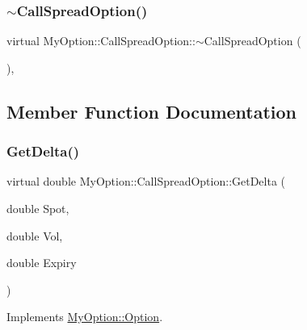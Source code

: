 \hypertarget{classMyOption_1_1CallSpreadOption_a20c0f91c648645718aa27007399101e7}{}\label{classMyOption_1_1CallSpreadOption_a20c0f91c648645718aa27007399101e7} 
\subsubsection{\texorpdfstring{$\sim$\+Call\+Spread\+Option()}{~CallSpreadOption()}}
{\footnotesize\ttfamily virtual My\+Option\+::\+Call\+Spread\+Option\+::$\sim$\+Call\+Spread\+Option (\begin{DoxyParamCaption}{ }\end{DoxyParamCaption})\hspace{0.3cm}{\ttfamily [inline]}, {\ttfamily [virtual]}}



\subsection{Member Function Documentation}
\hypertarget{classMyOption_1_1CallSpreadOption_a4655116155bf4551129eda47625acef0}{}\label{classMyOption_1_1CallSpreadOption_a4655116155bf4551129eda47625acef0} 
\subsubsection{\texorpdfstring{Get\+Delta()}{GetDelta()}}
{\footnotesize\ttfamily virtual double My\+Option\+::\+Call\+Spread\+Option\+::\+Get\+Delta (\begin{DoxyParamCaption}\item[{double}]{Spot,  }\item[{double}]{Vol,  }\item[{double}]{Expiry }\end{DoxyParamCaption})\hspace{0.3cm}{\ttfamily [virtual]}}



Implements \hyperlink{classMyOption_1_1Option_a4947bde99bb5e46b79aa0f36fd353d9b}{My\+Option\+::\+Option}.

